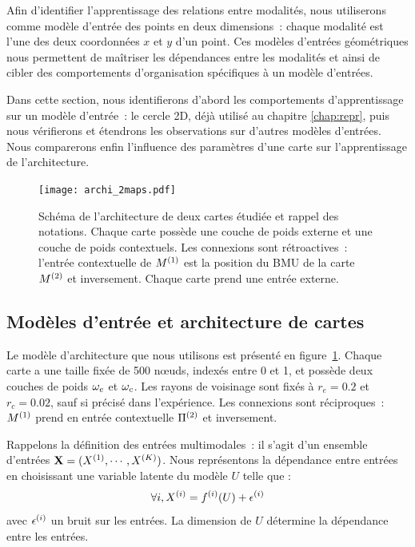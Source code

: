\documentclass[../main]{subfiles}
\begin{document}
Afin d'identifier l'apprentissage des relations entre modalités, nous utiliserons comme modèle d'entrée des points en deux dimensions~: chaque modalité est l'une des deux coordonnées $x$ et $y$ d'un point.
Ces modèles d'entrées géométriques nous permettent de maîtriser les dépendances entre les modalités et ainsi de cibler des comportements d'organisation spécifiques à un modèle d'entrées.

Dans cette section, nous identifierons d'abord les comportements d'apprentissage sur un modèle d'entrée~: le cercle 2D, déjà utilisé au chapitre \ref{chap:repr}, puis nous vérifierons et étendrons les observations sur d'autres modèles d'entrées.
Nous comparerons enfin l'influence des paramètres d'une carte sur l'apprentissage de l'architecture.

\begin{figure}[ht]
	\centering\texttt{[image: archi\_2maps.pdf]}
	\caption{Schéma de l'architecture de deux cartes étudiée et rappel des notations. Chaque carte possède une couche de poids externe et une couche de poids contextuels. Les connexions sont rétroactives~: l'entrée contextuelle de $M^{({1})}$ est la position du BMU de la carte $M^{({2})}$ et inversement. Chaque carte prend une entrée externe.\label{fig:archis}}
\end{figure}

\subsection{Modèles d'entrée et architecture de cartes}

Le modèle d'architecture que nous utilisons est présenté en figure~\ref{fig:archis}.
Chaque carte a une taille fixée de 500 n\oe{}uds, indexés entre 0 et 1, et possède deux couches de poids $\omega_e$ et $\omega_c$. Les rayons de voisinage sont fixés à $r_e = 0.2$ et $r_c = 0.02$, sauf si précisé dans l'expérience.
Les connexions sont réciproques~: $M^{({1})}$ prend en entrée contextuelle $\Pi^{({2})}$ et inversement.

Rappelons la définition des entrées multimodales~: il s'agit d'un ensemble d'entrées $\mathbf{X} = (X^{({1})}, \cdots, X^{({K})})$.
Nous représentons la dépendance entre entrées en choisissant une variable latente du modèle $U$ telle que :
$$ \forall i, X^{({i})} = f^{({i})}(U) + \epsilon^{({i})}$$
avec $\epsilon^{({i})}$ un bruit sur les entrées.
La dimension de $U$ détermine la dépendance entre les entrées.
\end{document}
